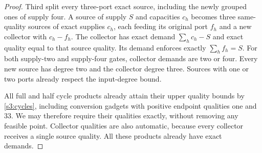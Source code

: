 \begin{proof}
Third split every three-port exact source, including the newly grouped
ones of supply four. A source of supply $S$ and capacities $c_h$ becomes
three same-quality sources of exact supplies $c_h$, each feeding its
original port $f_h$ and a new collector with $c_h-f_h$. The collector
has exact demand $\sum_hc_h-S$ and exact quality equal to that source
quality. Its demand enforces exactly $\sum_hf_h=S$. For both supply-two
and supply-four gates, collector demands are two or four. Every new
source has degree two and the collector degree three. Sources with one
or two ports already respect the input-degree bound.

All full and half cycle products already attain their upper quality
bounds by \cref{s3:cycles}, including conversion gadgets with positive
endpoint qualities one and 33. We may therefore require their qualities
exactly, without removing any feasible point. Collector qualities are
also automatic, because every collector receives a single source
quality. All these products already have exact demands.


\end{proof}
